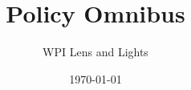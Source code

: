 \documentclass[a4paper,oneside]{book}
\title{Policy Omnibus}
\author{WPI Lens and Lights}
\date{\today}
\begin{document}
\renewcommand{\chaptername}{Section}
\maketitle
\tableofcontents
\newpage



\end{document}
